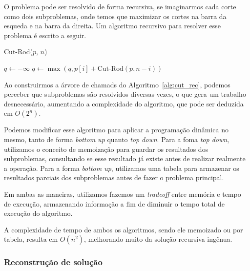 \documentclass{article}
\theoremstyle{mytheoremstyle}
\theoremstyle{mytheoremstyle}
\theoremstyle{myproblemstyle}
\begin{document}
            O problema pode ser resolvido de forma recursiva, se imaginarmos cada corte como dois subproblemas,
            onde temos que maximizar os cortes na barra da esqueda e na barra da direita. Um algoritmo recursivo
            para resolver esse problema é escrito a seguir.

            \begin{algorithm}[ht]
                \caption{Cut-Rod($p$, $n$)}
                \label{alg:cut_rec}
                \If {}
                \EndIf
                \State $q \gets -\infty$
                    \State $q \gets \max(q, p[i] + \text{Cut-Rod}(p, n - i))$
                \EndFor

            \end{algorithm}

            Ao construirmos a árvore de chamads do Algoritmo~\ref{alg:cut_rec}, podemos perceber que subproblemas são resolvidos
            diversas vezes, o que gera um trabalho desnecessário, aumentando a complexidade do algoritmo, que pode ser deduzida em
            $O(2^n)$.

            Podemos modificar esse algoritmo para aplicar a programação dinâmica no mesmo, tanto de forma \textit{bottom up} quanto
            \textit{top down}. Para a foma \textit{top down}, utilizamos o conceito de memoização para guardar os resultados dos subproblemas,
            consultando se esse resultado já existe antes de realizar realmente a operação. Para a forma \textit{bottom up}, utilizamos uma tabela
            para armazenar os resultados parciais dos subproblemas antes de fazer o problema principal.

            Em ambas as maneiras, utilizamos fazemos um \textit{tradeoff} entre memória e tempo de execução, armazenando informação
            a fim de diminuir o tempo total de execução do algoritmo.

            A complexidade de tempo de ambos os algoritmos, sendo ele memoizado ou por tabela, resulta em $O(n^2)$, melhorando muito da solução recursiva ingênua.

            \subsubsection{Reconstrução de solução} %
            \label{ssub:Reconstrução de solução}










    {}
    
\end{document}
